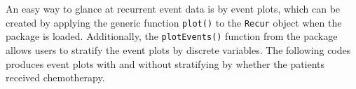 An easy way to glance at recurrent event data is by event plots, which
can be created by applying the generic function \texttt{plot()} to the
\texttt{Recur} object when the  package is loaded.
Additionally, the \texttt{plotEvents()} function from the 
package allows users to stratify the event plots by discrete variables.
The following codes produces event plots with and without stratifying by
whether the patients received chemotherapy.

\begin{Shaded}
\begin{Highlighting}[]
\StringTok{ }\OperatorTok{!}\StringTok{ }\NormalTok{(}\NormalTok{, }\NormalTok{, }\NormalTok{)))}
\StringTok{ }
 \NormalTok{) }
\StringTok{ }\OperatorTok{\textasciitilde{}}\StringTok{ }
 \NormalTok{) }
\end{Highlighting}
\end{Shaded}

